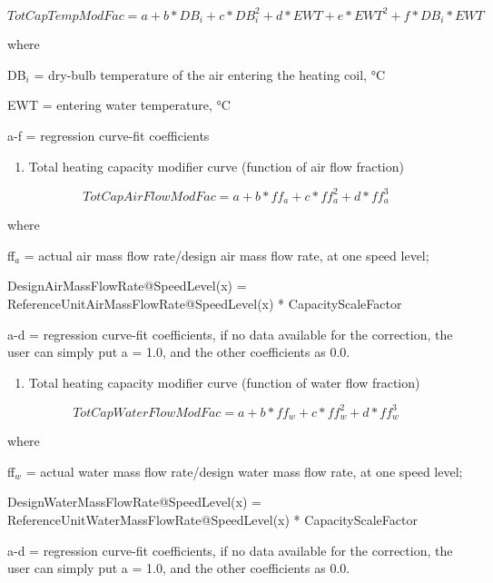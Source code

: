 \begin{equation}
TotCapTempModFac = a + b*D{B_i} + c*DB_i^2 + d*EWT + e*EW{T^2} + f*D{B_i}*EWT
\end{equation}

where

DB\(_{i}\) = dry-bulb temperature of the air entering the heating coil, °C

EWT = entering water temperature, °C

a-f = regression curve-fit coefficients

\begin{enumerate}
\def\labelenumi{\arabic{enumi})}
\setcounter{enumi}{1}
\tightlist
\item
  Total heating capacity modifier curve (function of air flow fraction)
\end{enumerate}

\begin{equation}
TotCapAirFlowModFac = a + b*f{f_a} + c*ff_a^2 + d*ff_a^3
\end{equation}

where

ff\(_{a}\) = actual air mass flow rate/design air mass flow rate, at one speed level;

DesignAirMassFlowRate@SpeedLevel(x) = ReferenceUnitAirMassFlowRate@SpeedLevel(x) * CapacityScaleFactor

a-d = regression curve-fit coefficients, if no data available for the correction, the user can simply put a = 1.0, and the other coefficients as 0.0.

\begin{enumerate}
\def\labelenumi{\arabic{enumi})}
\setcounter{enumi}{2}
\tightlist
\item
  Total heating capacity modifier curve (function of water flow fraction)
\end{enumerate}

\begin{equation}
TotCapWaterFlowModFac = a + b*f{f_w} + c*ff_w^2 + d*ff_w^3
\end{equation}

where

ff\(_{w}\) = actual water mass flow rate/design water mass flow rate, at one speed level;

DesignWaterMassFlowRate@SpeedLevel(x) = ReferenceUnitWaterMassFlowRate@SpeedLevel(x) * CapacityScaleFactor

a-d = regression curve-fit coefficients, if no data available for the correction, the user can simply put a = 1.0, and the other coefficients as 0.0.


